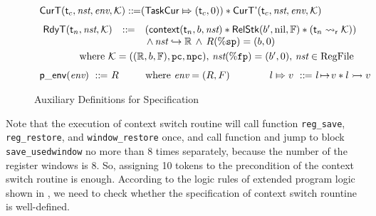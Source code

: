 \begin{figure}[!t]
\[\begin{array}{l}
            \\[-5pt]
            \RelCurT{\thrdid_c}{\nst}{\env}{\hthrdlocalst} \define 
            (\relmsto{\TaskCur}{(\thrdid_c, 0)}) \sepstar 
            \RelCurTAux{\thrdid_c}{\nst}{\env}{\hthrdlocalst} \\
            \\[-5pt]
            \hspace*{-0.15em}
            \begin{array}{lll}
                \RelRdyT{\thrdid_n}{\nst}{\hthrdlocalst} & \define & 
                (\relcontext{\thrdid_n}{\block}{\nst}
                \sepstar 
                \RelStk{\block'}{\nil}{\hWstk} \sepstar 
                (\astRdyCont{\thrdid_n}{\hthrdlocalst})) \\
                & &  
                \, \land \, 
                \Rinj{\nst}{\hRfile} \, \land \, \RFile(\spreg) = (\block, 0)
            \end{array}  \\
            \\[-9pt]
            \qquad\qquad
            \text{where} \ \hthrdlocalst = ((\hRfile, \block, \hWstk), \pc, \npc), 
            \, \nst(\fpreg) = (\block', 0), \, \nst \in \text{RegFile} \\
            \\[-5pt]
            \pEnv{\env} \ \define \ \RFile \qquad \ \ \text{where} \ \env = (\RFile, \Wstack)
            \qquad\qquad
            \relmsto{\loc}{\val} \ \define \ 
            \msto{\loc}{\val} \sepstar \hmsto{\loc}{\val} 
        \end{array}
    \]
    \caption{Auxiliary Definitions for Specification}
    \label{def:aux-def-spec}
\end{figure}

Note that the execution of context switch routine will 
call function \texttt{reg\_save}, \texttt{reg\_restore}, and  
\texttt{window\_restore} once, and call function \WinSave{} 
and jump to block \texttt{save\_usedwindow} no more than 8 times separately, 
because the number of the register windows is 8. So, assigning 10 tokens 
to the precondition of the context switch routine is enough. 
According to the logic rules of extended program logic shown 
in \Fig{\ref{fig:Selected Inference Rules for Refinement Verification}}, 
we need to check whether the specification of context switch rountine 
is well-defined. 

